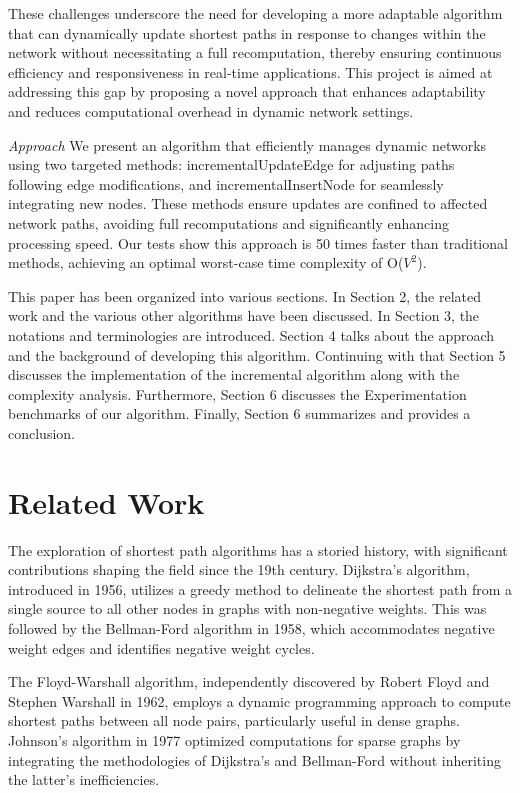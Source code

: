 \documentclass[conference]{IEEEtran}
\begin{document}
These challenges underscore the need for developing a more adaptable algorithm that can dynamically update shortest paths in response to changes within the network without necessitating a full recomputation, thereby ensuring continuous efficiency and responsiveness in real-time applications. This project is aimed at addressing this gap by proposing a novel approach that enhances adaptability and reduces computational overhead in dynamic network settings.

\noindent\textit{Approach} 
We present an algorithm that efficiently manages dynamic networks using two targeted methods: incrementalUpdateEdge for adjusting paths following edge modifications, and incrementalInsertNode for seamlessly integrating new nodes. These methods ensure updates are confined to affected network paths, avoiding full recomputations and significantly enhancing processing speed. Our tests show this approach is 50 times faster than traditional methods, achieving an optimal worst-case time complexity of O($V^2$).

This paper has been organized into various sections. In Section 2, the related work and the various other algorithms have been discussed. In Section 3, the notations and terminologies are introduced. Section 4 talks about the approach and the background of developing this algorithm. Continuing with that Section 5 discusses the implementation of the incremental algorithm along with the complexity analysis. Furthermore, Section 6 discusses the Experimentation benchmarks of our algorithm. Finally, Section 6 summarizes and provides a conclusion.

\section{Related Work}
The exploration of shortest path algorithms has a storied history, with significant contributions shaping the field since the 19th century. Dijkstra's algorithm, introduced in 1956, utilizes a greedy method to delineate the shortest path from a single source to all other nodes in graphs with non-negative weights​​. This was followed by the Bellman-Ford algorithm in 1958, which accommodates negative weight edges and identifies negative weight cycles​​.

The Floyd-Warshall algorithm, independently discovered by Robert Floyd and Stephen Warshall in 1962, employs a dynamic programming approach to compute shortest paths between all node pairs, particularly useful in dense graphs. Johnson’s algorithm in 1977 optimized computations for sparse graphs by integrating the methodologies of Dijkstra's and Bellman-Ford without inheriting the latter's inefficiencies.
\end{document}
